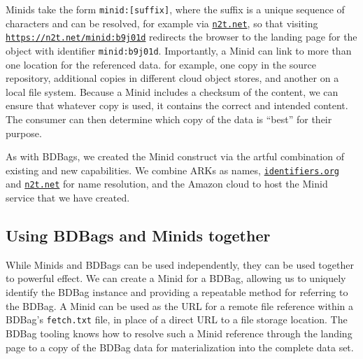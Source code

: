 \documentclass[11pt]{article}
\begin{document}
Minids  take the form \texttt{minid:[suffix]}, where  the suffix is a unique sequence of characters
and can be resolved, for example via \texttt{\href{https://n2t.net}{n2t.net}},
so that visiting
\texttt{\href{https://n2t.net/minid:b9j01d}{https://n2t.net/minid:b9j01d}} 
redirects the browser to the landing page for the
object with identifier \texttt{minid:b9j01d}.
Importantly, a Minid can link to more than one location for the referenced data.
for example, one copy in the source repository, 
additional copies in different cloud object stores, and another on a local file system.
Because a Minid includes a checksum of the content, 
we can ensure that whatever copy is used, it contains the correct and intended content.
The consumer can then determine which copy of the data is ``best'' for their purpose.

As with BDBags, we created the Minid construct via the artful combination of existing and new capabilities.
We combine ARKs as names, 
\texttt{\href{https://identifiers.org}{identifiers.org}} and \texttt{\href{https://n2t.net}{n2t.net}} for name resolution,
and the Amazon cloud to host the Minid service that we have created.

\vspace{2ex}

\noindent{}
 


\subsection{Using BDBags and Minids together} 

While Minids and BDBags can be used independently, they can be used together to powerful effect. 
We can create a Minid for a BDBag, 
allowing us to uniquely identify the BDBag instance and providing a repeatable method for referring to the BDBag. 
A Minid can be used as the URL for a remote file reference within a BDBag's \texttt{fetch.txt} file,
in place of a direct URL to a file storage location.  
The BDBag tooling knows how to resolve such a Minid reference
through the landing page to a copy of the BDBag data
for materialization into the complete data set.  
\end{document}
